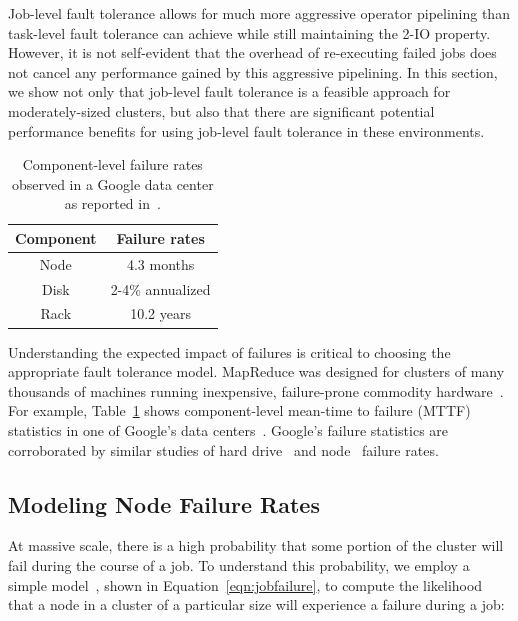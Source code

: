 Job-level fault tolerance allows for much more aggressive operator pipelining
than task-level fault tolerance can achieve while still maintaining the 2-IO
property.  However, it is not self-evident that the overhead of re-executing
failed jobs does not cancel any performance gained by this aggressive
pipelining.  In this section, we show not only that job-level fault tolerance
is a feasible approach for moderately-sized clusters, but also that there are
significant potential performance benefits for using job-level fault tolerance
in these environments.

\begin{table}
\centering
\caption{\label{tbl:googleMttf} Component-level failure rates
observed in a Google data center as reported
in~\cite{google-availability:osdi10}.}
\begin{tabular}{|c|c|} \hline
\textbf{Component} & \textbf{Failure rates}\\\hline
Node & 4.3 months \\
Disk & 2-4\% annualized\\
Rack & 10.2 years \\\hline
\end{tabular}
\end{table}

Understanding the expected impact of failures is critical to choosing the
appropriate fault tolerance model.  MapReduce was designed for clusters of many
thousands of machines running inexpensive, failure-prone commodity
hardware~\cite{mapreduce}.  For example, Table~\ref{tbl:googleMttf} shows
component-level mean-time to failure (MTTF) statistics in one of Google's data
centers~\cite{google-availability:osdi10}. Google's failure statistics are
corroborated by similar studies of hard
drive~\cite{DBLP:conf/fast/PinheiroWB07,Schroeder:2007:UDF:1288783.1288785} and
node~\cite{DBLP:conf/nsdi/NathYGS06, Schroeder:2010:LSF:1916484.1916652}
failure rates.

\subsection{Modeling Node Failure Rates}

At massive scale, there is a high probability that some portion of the cluster
will fail during the course of a job.  To understand this probability, we
employ a simple model~\cite{sysreliability}, shown in
Equation~\ref{eqn:jobfailure}, to compute the likelihood that a node in a
cluster of a particular size will experience a failure during a job:

